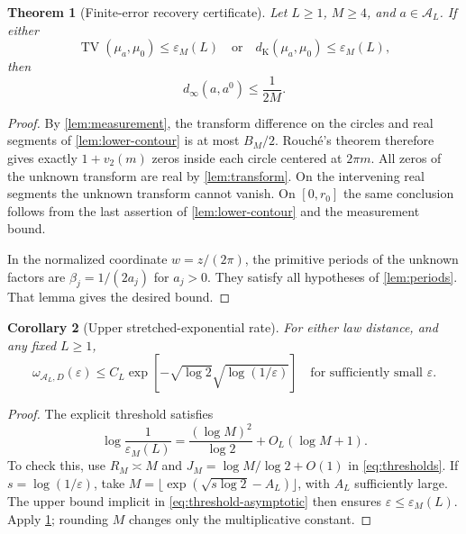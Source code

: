 \documentclass[11pt,a4paper]{article}
\numberwithin{equation}{section}
\newtheorem{theorem}{Theorem}[section]
\newtheorem{corollary}[theorem]{Corollary}
\theoremstyle{definition}
\theoremstyle{remark}
\DeclareMathOperator{\TV}{TV}
\newcommand{\A}{\mathcal A}
\newcommand{\eps}{\varepsilon}
\newcommand{\distK}{d_{\mathrm K}}
\begin{document}
\begin{theorem}[Finite-error recovery certificate]
\label{thm:finite-upper}
Let $L\ge1$, $M\ge4$, and $a\in\A_L$. If either
\[
 \TV(\mu_a,\mu_0)\le\eps_M(L)
 \quad\text{or}\quad
 \distK(\mu_a,\mu_0)\le\eps_M(L),
\]
then
\begin{equation}
 d_\infty(a,a^0)\le\frac1{2M}.
 \label{eq:finite-upper}
\end{equation}
\end{theorem}
\begin{proof}
By \cref{lem:measurement}, the transform difference on the circles and real
segments of \cref{lem:lower-contour} is at most $B_M/2$.
Rouch\'e's theorem therefore gives exactly $1+v_2(m)$ zeros inside each
circle centered at $2\pi m$. All zeros of the unknown transform are real
by \cref{lem:transform}. On the intervening real segments the unknown
transform cannot vanish. On $[0,r_0]$ the same conclusion follows from the
last assertion of \cref{lem:lower-contour} and the measurement bound.

In the normalized coordinate $w=z/(2\pi)$, the primitive periods of the
unknown factors are $\beta_j=1/(2a_j)$ for $a_j>0$. They satisfy all
hypotheses of \cref{lem:periods}. That lemma gives the desired bound.
\end{proof}

\begin{corollary}[Upper stretched-exponential rate]
\label{cor:upper}
For either law distance, and any fixed $L\ge1$,
\begin{equation}
 \omega_{\A_L,D}(\eps)
 \le C_L\exp\left[-\sqrt{\log2}\sqrt{\log(1/\eps)}\right]
 \quad\text{for sufficiently small }\eps.
 \label{eq:upper-asymptotic}
\end{equation}
\end{corollary}
\begin{proof}
The explicit threshold satisfies
\begin{equation}
 \log\frac1{\eps_M(L)}
 =\frac{(\log M)^2}{\log2}+O_L(\log M+1).
 \label{eq:threshold-asymptotic}
\end{equation}
To check this, use $R_M\asymp M$ and
$J_M=\log M/\log2+O(1)$ in \eqref{eq:thresholds}.
If $s=\log(1/\eps)$, take
$M=\lfloor\exp(\sqrt{s\log2}-A_L)\rfloor$, with $A_L$ sufficiently
large. The upper bound implicit in \eqref{eq:threshold-asymptotic} then
ensures $\eps\le\eps_M(L)$. Apply \cref{thm:finite-upper}; rounding $M$
changes only the multiplicative constant.
\end{proof}
\end{document}
